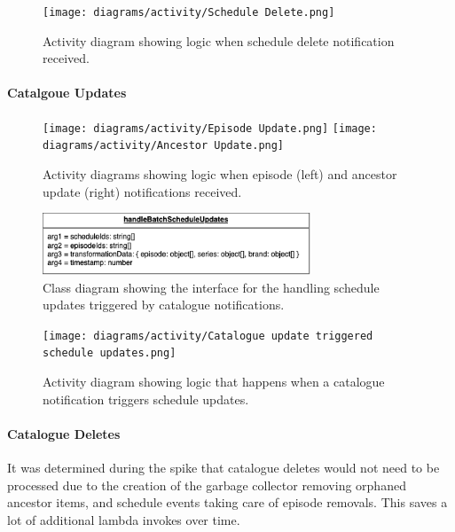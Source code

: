   \begin{figure}[H]
    \centering
    \texttt{[image: diagrams/activity/Schedule Delete.png]}
    \caption{Activity diagram showing logic when schedule delete notification received.}
    \label{fig:scheduleDeleteActivity}
  \end{figure}

  \paragraph{Catalgoue Updates}

  \begin{figure}[H]
    \centering
    \texttt{[image: diagrams/activity/Episode Update.png]}
    \texttt{[image: diagrams/activity/Ancestor Update.png]}
    \caption{Activity diagrams showing logic when episode (left) and ancestor update (right) notifications received.}
    \label{fig:scheduleUpdateCatalogueActivity}
  \end{figure}

  \begin{figure}[H]
    \centering
    \includegraphics[width=8cm]{assets/handleBatchScheduleInterface.drawio.png}
    \caption{Class diagram showing the interface for the handling schedule updates triggered by catalogue notifications.}
    \label{fig:catalogueTriggeredScheduleUpdateClass}
  \end{figure}

  \begin{figure}[H]
    \centering
    \texttt{[image: diagrams/activity/Catalogue update triggered schedule updates.png]}
    \caption{Activity diagram showing logic that happens when a catalogue notification triggers schedule updates.}
    \label{fig:catalogueTriggeredScheduleUpdateActivity}
  \end{figure}

  \paragraph{Catalogue Deletes}
  It was determined during the spike that catalogue deletes would not need to be processed due to the creation of the garbage collector removing 
  orphaned ancestor items, and schedule events taking care of episode removals. This saves a lot of additional lambda invokes over time.

